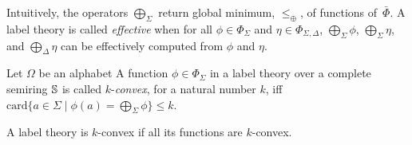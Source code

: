 \noindent 
Intuitively, the operators $\bigoplus_\Sigma$ 
return global minimum, \wrt $\leq_\oplus$, of functions of~$\bar\Phi$. 
%
A label theory is called \emph{effective} when 
for all $\phi \in \Phi_\Sigma$ and $\eta \in \Phi_{\Sigma, \Delta}$, 
$\bigoplus_{\Sigma} \phi$, 
$\bigoplus_{\Sigma} \eta$, and
$\bigoplus_{\Delta} \eta$
can be effectively computed from $\phi$ and $\eta$.


\begin{definition}\label{def:label-th-convex}
Let $\Omega$ be an alphabet 
A function $\phi \in \Phi_\Sigma$ in a label theory over a complete semiring $\mathbb{S}$
is called $k$-\emph{convex}, for a natural number $k$, iff 
$\mathrm{card}\{ a \in \Sigma \mid \phi(a) = \bigoplus_{\Sigma} \phi \} \leq k$.
\end{definition}
A label theory is $k$-convex if all its functions are $k$-convex.




